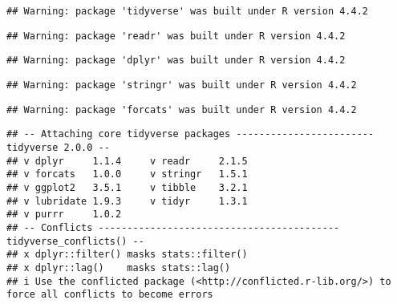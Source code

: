 \documentclass[
]{article}
\newenvironment{Shaded}{\begin{snugshade}}{\end{snugshade}}
\newcommand{\AttributeTok}[1]{\textcolor[rgb]{0.13,0.29,0.53}{#1}}
\newcommand{\FunctionTok}[1]{\textcolor[rgb]{0.13,0.29,0.53}{\textbf{#1}}}
\newcommand{\NormalTok}[1]{#1}
\newcommand{\OtherTok}[1]{\textcolor[rgb]{0.56,0.35,0.01}{#1}}
\newcommand{\SpecialCharTok}[1]{\textcolor[rgb]{0.81,0.36,0.00}{\textbf{#1}}}
\newcommand{\StringTok}[1]{\textcolor[rgb]{0.31,0.60,0.02}{#1}}
\begin{document}
\begin{verbatim}
## Warning: package 'tidyverse' was built under R version 4.4.2
\end{verbatim}

\begin{verbatim}
## Warning: package 'readr' was built under R version 4.4.2
\end{verbatim}

\begin{verbatim}
## Warning: package 'dplyr' was built under R version 4.4.2
\end{verbatim}

\begin{verbatim}
## Warning: package 'stringr' was built under R version 4.4.2
\end{verbatim}

\begin{verbatim}
## Warning: package 'forcats' was built under R version 4.4.2
\end{verbatim}

\begin{verbatim}
## -- Attaching core tidyverse packages ------------------------ tidyverse 2.0.0 --
## v dplyr     1.1.4     v readr     2.1.5
## v forcats   1.0.0     v stringr   1.5.1
## v ggplot2   3.5.1     v tibble    3.2.1
## v lubridate 1.9.3     v tidyr     1.3.1
## v purrr     1.0.2     
## -- Conflicts ------------------------------------------ tidyverse_conflicts() --
## x dplyr::filter() masks stats::filter()
## x dplyr::lag()    masks stats::lag()
## i Use the conflicted package (<http://conflicted.r-lib.org/>) to force all conflicts to become errors
\end{verbatim}

\begin{Shaded}
\end{Shaded}
\end{document}
